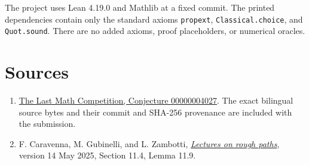 \documentclass[11pt]{article}
\begin{document}
The project uses Lean 4.19.0 and Mathlib at a fixed commit. The printed
dependencies contain only the standard axioms \texttt{propext},
\texttt{Classical.choice}, and \texttt{Quot.sound}.
There are no added axioms, proof placeholders, or numerical oracles.

\section*{Sources}
\begin{enumerate}
\item \href{https://github.com/The-Last-Math-Competition/The-Last-Math-Competition/blob/9b795e7a94a6076e49a65a6489e1caf9153abd23/conjectures/00000004027.md}{The Last Math Competition, Conjecture 00000004027}.
The exact bilingual source bytes and their commit and SHA-256 provenance
are included with the submission.
\item F. Caravenna, M. Gubinelli, and L. Zambotti,
\href{https://www.lpsm.paris/_media/users/zambotti/bookcgz.pdf}{\emph{Lectures on rough paths}},
version 14 May 2025, Section 11.4, Lemma 11.9.
\end{enumerate}
\end{document}
